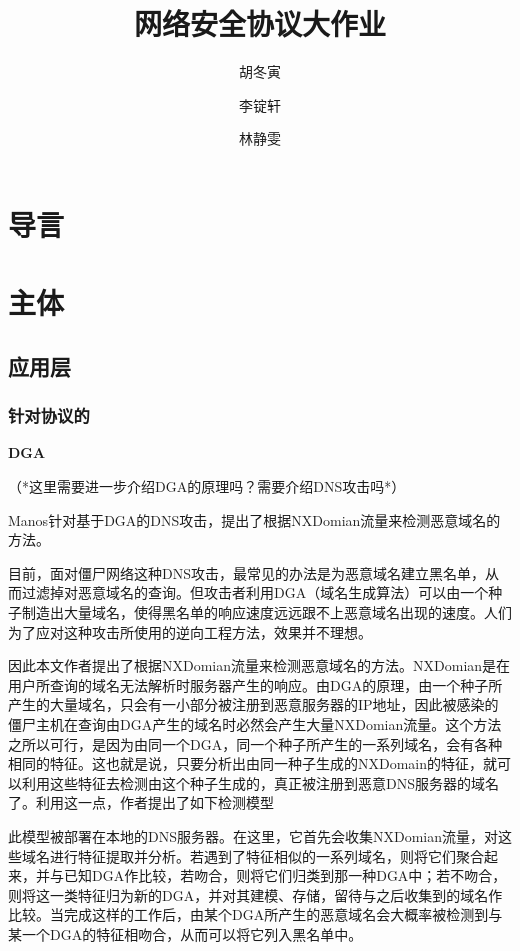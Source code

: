 \documentclass[11pt]{article} %
\title{网络安全协议大作业}
\author{胡冬寅 \and 李锭轩 \and 林静雯}
\date{} %
\begin{document}
\maketitle

\section{导言}

\section{主体}
\label{main}

\subsection{应用层}
\label{app}

\subsubsection{针对协议的}
\label{protocol}

\textbf{DGA}

（*这里需要进一步介绍DGA的原理吗？需要介绍DNS攻击吗*）

Manos针对基于DGA的DNS攻击，提出了根据NXDomian流量来检测恶意域名的方法。

目前，面对僵尸网络这种DNS攻击，最常见的办法是为恶意域名建立黑名单，从而过滤掉对恶意域名的查询。但攻击者利用DGA（域名生成算法）可以由一个种子制造出大量域名，使得黑名单的响应速度远远跟不上恶意域名出现的速度。人们为了应对这种攻击所使用的逆向工程方法，效果并不理想。

因此本文作者提出了根据NXDomian流量来检测恶意域名的方法。NXDomian是在用户所查询的域名无法解析时服务器产生的响应。由DGA的原理，由一个种子所产生的大量域名，只会有一小部分被注册到恶意服务器的IP地址，因此被感染的僵尸主机在查询由DGA产生的域名时必然会产生大量NXDomian流量。这个方法之所以可行，是因为由同一个DGA，同一个种子所产生的一系列域名，会有各种相同的特征。这也就是说，只要分析出由同一种子生成的NXDomain的特征，就可以利用这些特征去检测由这个种子生成的，真正被注册到恶意DNS服务器的域名了。利用这一点，作者提出了如下检测模型


此模型被部署在本地的DNS服务器。在这里，它首先会收集NXDomian流量，对这些域名进行特征提取并分析。若遇到了特征相似的一系列域名，则将它们聚合起来，并与已知DGA作比较，若吻合，则将它们归类到那一种DGA中；若不吻合，则将这一类特征归为新的DGA，并对其建模、存储，留待与之后收集到的域名作比较。当完成这样的工作后，由某个DGA所产生的恶意域名会大概率被检测到与某一个DGA的特征相吻合，从而可以将它列入黑名单中。
\end{document}
